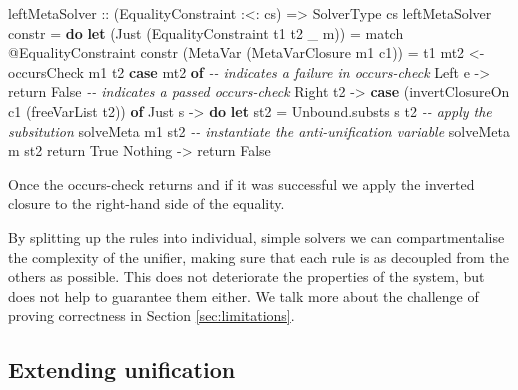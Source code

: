 \documentclass[
  sigconf,
  screen,
  review]{acmart}
\newenvironment{Shaded}{}{}
\newcommand{\CommentTok}[1]{\textcolor[rgb]{0.38,0.63,0.69}{\textit{#1}}}
\newcommand{\DataTypeTok}[1]{\textcolor[rgb]{0.56,0.13,0.00}{#1}}
\newcommand{\FunctionTok}[1]{\textcolor[rgb]{0.02,0.16,0.49}{#1}}
\newcommand{\KeywordTok}[1]{\textcolor[rgb]{0.00,0.44,0.13}{\textbf{#1}}}
\newcommand{\NormalTok}[1]{#1}
\newcommand{\OperatorTok}[1]{\textcolor[rgb]{0.40,0.40,0.40}{#1}}
\newcommand{\OtherTok}[1]{\textcolor[rgb]{0.00,0.44,0.13}{#1}}
\begin{document}
\begin{Shaded}
\begin{Highlighting}[]
\OtherTok{leftMetaSolver ::}\NormalTok{ (}\DataTypeTok{EqualityConstraint} \OperatorTok{:\textless{}:}\NormalTok{ cs)}
               \OtherTok{=\textgreater{}} \DataTypeTok{SolverType}\NormalTok{ cs}
\NormalTok{leftMetaSolver constr }\OtherTok{=} \KeywordTok{do}
  \KeywordTok{let}\NormalTok{ (}\DataTypeTok{Just}\NormalTok{ (}\DataTypeTok{EqualityConstraint}\NormalTok{ t1 t2 \_ m)) }\OtherTok{=}
\NormalTok{        match }\OperatorTok{@}\DataTypeTok{EqualityConstraint}\NormalTok{ constr}
\NormalTok{      (}\DataTypeTok{MetaVar}\NormalTok{ (}\DataTypeTok{MetaVarClosure}\NormalTok{ m1 c1)) }\OtherTok{=}\NormalTok{ t1}
\NormalTok{  mt2 }\OtherTok{\textless{}{-}}\NormalTok{ occursCheck m1 t2}
  \KeywordTok{case}\NormalTok{ mt2 }\KeywordTok{of}
    \CommentTok{{-}{-} indicates a failure in occurs{-}check}
    \DataTypeTok{Left}\NormalTok{ e }\OtherTok{{-}\textgreater{}} \FunctionTok{return} \DataTypeTok{False}
    \CommentTok{{-}{-} indicates a passed occurs{-}check}
    \DataTypeTok{Right}\NormalTok{ t2 }\OtherTok{{-}\textgreater{}}
      \KeywordTok{case}\NormalTok{ (invertClosureOn c1 (freeVarList t2)) }\KeywordTok{of}
        \DataTypeTok{Just}\NormalTok{ s }\OtherTok{{-}\textgreater{}} \KeywordTok{do}
          \KeywordTok{let}\NormalTok{ st2 }\OtherTok{=}\NormalTok{ Unbound.substs s t2}
          \CommentTok{{-}{-} apply the subsitution}
\NormalTok{          solveMeta m1 st2}
          \CommentTok{{-}{-} instantiate the anti{-}unification variable}
\NormalTok{          solveMeta m st2}
          \FunctionTok{return} \DataTypeTok{True}
        \DataTypeTok{Nothing} \OtherTok{{-}\textgreater{}} \FunctionTok{return} \DataTypeTok{False}
\end{Highlighting}
\end{Shaded}

Once the occurs-check returns and if it was successful we apply the
inverted closure to the right-hand side of the equality.

By splitting up the rules into individual, simple solvers we can
compartmentalise the complexity of the unifier, making sure that each
rule is as decoupled from the others as possible. This does not
deteriorate the properties of the system, but does not help to guarantee
them either. We talk more about the challenge of proving correctness in
Section \ref{sec:limitations}.

\hypertarget{extending-unification}{%
\subsection{Extending unification}\label{extending-unification}}
\end{document}
